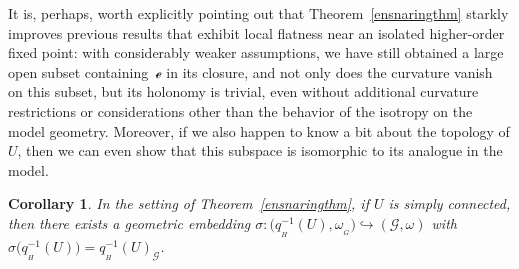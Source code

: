 \documentclass[pdftex]{sigma}
\numberwithin{equation}{section}
\newtheorem{Corollary}[Theorem]{Corollary}
\theoremstyle{definition}
\newcommand{\MC}[1]{\omega_{{}_{#1}}}
\begin{document}
It is, perhaps, worth explicitly pointing out that Theorem~\ref{ensnaringthm} starkly improves previous results that exhibit local flatness near an isolated higher-order fixed point: with considerably weaker assumptions, we have still obtained a large open subset  containing~$\mathscr{e}$ in its closure, and not only does the curvature vanish on this subset, but its holonomy is trivial, even without additional curvature restrictions or considerations other than the behavior of the isotropy on the model geometry. Moreover, if we also happen to know a bit about the topology of $U$, then we can even show that this subspace is isomorphic to its analogue in the model.

\begin{Corollary}\label{ensnaringthmcor} In the setting of Theorem~{\rm \ref{ensnaringthm}}, if $U$ is simply connected, then there exists a geometric embedding $\sigma\colon \bigl(q_{{}_H}^{-1}(U),\MC{G}\bigr)\hookrightarrow(\mathscr{G},\omega)$ with $\sigma\bigl(q_{{}_H}^{-1}(U)\bigr)=q_{{}_H}^{-1}(U)_\mathscr{G}$.
\end{Corollary}
\end{document}
